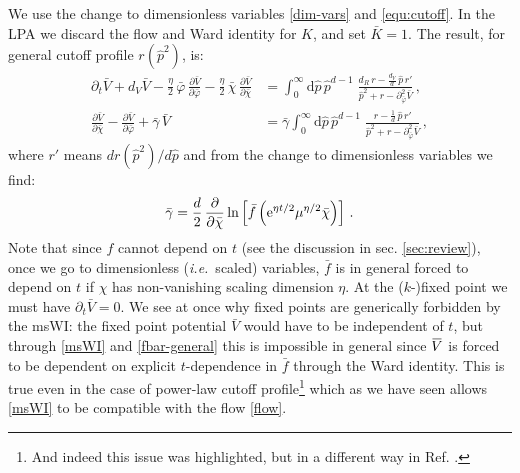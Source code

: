 \documentclass[11pt]{book} %
\newcommand{\overbar}[1]{\mkern 1.5mu\overline{\mkern-1.5mu#1\mkern-1.5mu}\mkern 1.5mu}
\newcommand{\bV}{\overbar V}
\newcommand\ie{\textit{i.e.}\ }
\newcommand{\bc}{\bar \chi}
\numberwithin{equation}{chapter}
\begin{document}
We use the change to dimensionless variables \eqref{dim-vars} and \eqref{equ:cutoff}.
In the LPA we discard the flow and Ward identity for $K$, and set $\bar K=1$.
The result, for general cutoff profile $r(\hat{p}^2)$, is:
\begin{align}
  \label{flow}
  \partial_t \bar V + d_V \bar V - \frac{\eta}{2} \, \bar\varphi \, \frac{\partial \bar V}{\partial \bar\varphi} - \frac{\eta}{2} \, \bar\chi \, \frac{\partial \bar V}{\partial \bar\chi} &=
  \int_0^{\infty} \mathrm d\hat p \, \hat p^{d-1} \; \frac{d_R\, r - \frac{d_V}{d} \, \hat p \, r'}{\hat p^2 + r - \partial^2_{\bar\varphi}\bar V}\,,\\
  \label{msWI}
  \frac{\partial \bar V}{\partial \bar\chi} - \frac{\partial \bar V}{\partial \bar\varphi} + \bar \gamma \, \bar V &= \bar \gamma
  \int_0^{\infty} \mathrm d\hat p \, \hat p^{d-1} \; \frac{r - \frac{1}{d} \, \hat p \, r'}{\hat p^2 + r - \partial^2_{\bar\varphi}\bar V} \,,
\end{align}
where $r'$ means $dr(\hat{p}^2)/d\hat{p}$ and from the change to dimensionless variables we find:
\begin{align}
  \label{fbar-general}
  \bar{\gamma} = \frac{d}{2} \, \frac{\partial}{\partial\bc}\ln
  \left[
    \bar{f}\left({\rm e}^{\eta t/2}\mu^{\eta/2}\bc\right)
  \right]\,.
\end{align}
Note that since $f$ cannot depend on $t$ (see the discussion in sec. \ref{sec:review}),
once we go to dimensionless (\ie scaled) variables, $\bar{f}$ is in general forced to depend on
$t$ if $\chi$ has non-vanishing scaling dimension $\eta$.
At the ($k$-)fixed point we must have $\partial_t \bar V = 0$. We see at once why fixed points are
generically forbidden by the msWI: the fixed point potential $\bar{V}$ would have to be independent of $t$,
but through \eqref{msWI} and \eqref{fbar-general} this is impossible in general since $\bV$ is forced
to be dependent on explicit $t$-dependence in $\bar{f}$ through the Ward identity.
This is true even in the case of power-law cutoff profile\footnote{And indeed this issue was highlighted,
but in a different way in Ref. \cite{Dietz:2015owa}.} which as we have seen allows \eqref{msWI} to be
compatible with the flow \eqref{flow}.
\end{document}
